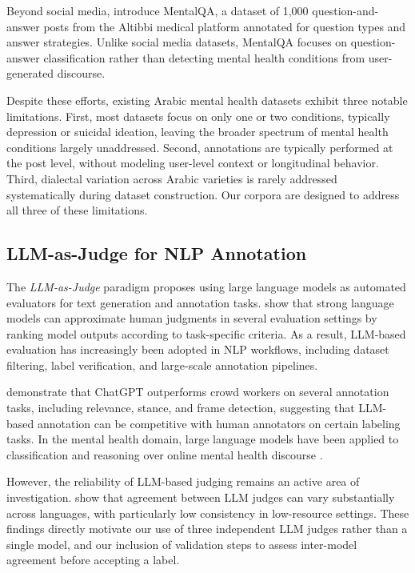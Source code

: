 \documentclass[11pt]{article}
\begin{document}
Beyond social media, \citet{alhuzali2024mentalqa} introduce MentalQA, a dataset
of 1,000 question-and-answer posts from the Altibbi medical platform annotated for
question types and answer strategies. Unlike social media datasets, MentalQA
focuses on question-answer classification rather than detecting mental health
conditions from user-generated discourse.

Despite these efforts, existing Arabic mental health datasets exhibit three
notable limitations. First, most datasets focus on only one or two conditions,
typically depression or suicidal ideation, leaving the broader spectrum of mental
health conditions largely unaddressed. Second, annotations are typically performed
at the post level, without modeling user-level context or longitudinal behavior.
Third, dialectal variation across Arabic varieties is rarely addressed
systematically during dataset construction. Our corpora are designed to address
all three of these limitations.

\subsection{LLM-as-Judge for NLP Annotation}
\label{subsec:related_llm_judge}

The \textit{LLM-as-Judge} paradigm proposes using large language models as
automated evaluators for text generation and annotation tasks.
\citet{zheng2023judging} show that strong language models can approximate human
judgments in several evaluation settings by ranking model outputs according to
task-specific criteria. As a result, LLM-based evaluation has increasingly been
adopted in NLP workflows, including dataset filtering, label verification, and
large-scale annotation pipelines.

\citet{gilardi2023chatgpt} demonstrate that ChatGPT outperforms crowd workers on
several annotation tasks, including relevance, stance, and frame detection,
suggesting that LLM-based annotation can be competitive with human annotators
on certain labeling tasks. In the mental health domain, large language models
have been applied to classification and reasoning over online mental health
discourse \cite{xu2024mental}.

However, the reliability of LLM-based judging remains an active area of
investigation. \citet{fu-liu-2025-reliable} show that agreement between LLM judges
can vary substantially across languages, with particularly low consistency in
low-resource settings. These findings directly motivate our use of three
independent LLM judges rather than a single model, and our inclusion of
validation steps to assess inter-model agreement before accepting a label.
\end{document}

